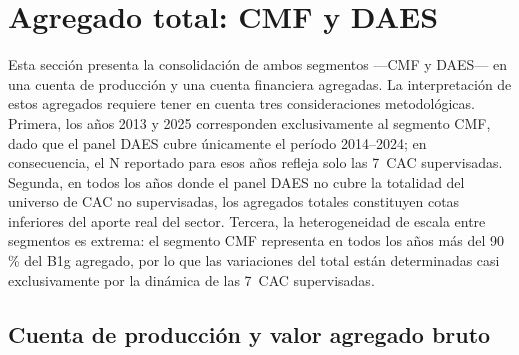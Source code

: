 \section{Agregado total: CMF y DAES}
\label{sec:agregado-total}

Esta sección presenta la consolidación de ambos segmentos —CMF
y DAES— en una cuenta de producción y una cuenta financiera
agregadas. La interpretación de estos agregados requiere tener
en cuenta tres consideraciones metodológicas. Primera, los años
2013 y 2025 corresponden exclusivamente al segmento CMF, dado
que el panel DAES cubre únicamente el período 2014--2024; en
consecuencia, el N reportado para esos años refleja solo las
7~CAC supervisadas. Segunda, en todos los años donde el panel
DAES no cubre la totalidad del universo de CAC no supervisadas,
los agregados totales constituyen cotas inferiores del aporte
real del sector. Tercera, la heterogeneidad de escala entre
segmentos es extrema: el segmento CMF representa en todos los
años más del 90\,\% del B1g agregado, por lo que las
variaciones del total están determinadas casi exclusivamente
por la dinámica de las 7~CAC supervisadas.

\subsection{Cuenta de producción y valor agregado bruto}
\label{subsec:produccion-total}

